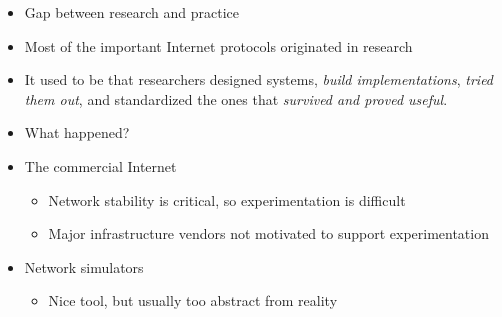 \documentclass[landscape]{icsislides}
\begin{document}
\begin{slide}

\begin{itemize}
  \item Gap between research and practice

  \item Most of the important Internet protocols originated in research

  \item It used to be that researchers designed systems, \emph{build
  implementations}, \emph{tried them out}, and standardized the ones that
  \emph{survived and proved useful}.

  \item What happened?

\end{itemize}

\end{slide}

\begin{slide}

\begin{itemize}
  \item The commercial Internet
  \begin{itemize}
    \item Network stability is critical, so experimentation is difficult
    \item Major infrastructure vendors not motivated to support
    experimentation
  \end{itemize}

  \item Network simulators
  \begin{itemize}
    \item Nice tool, but usually too abstract from reality
  \end{itemize}

\end{itemize}

\end{slide}
\end{document}
